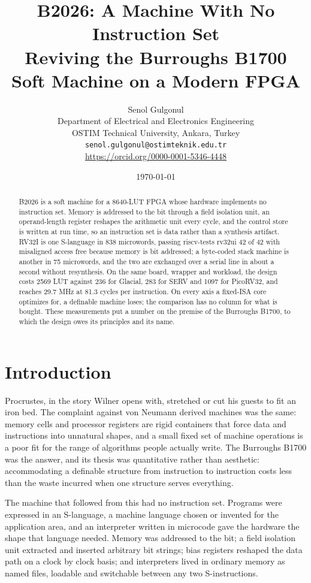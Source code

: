 \documentclass[11pt,a4paper]{article}
\title{B2026: A Machine With No Instruction Set\\
Reviving the Burroughs B1700 Soft Machine on a Modern FPGA}
\author{Senol Gulgonul\\
Department of Electrical and Electronics Engineering\\
OSTIM Technical University, Ankara, Turkey\\
\texttt{senol.gulgonul@ostimteknik.edu.tr}\\
\url{https://orcid.org/0000-0001-5346-4448}}
\date{\today}
\begin{document}
\maketitle

\begin{abstract}
B2026 is a soft machine for a 8640-LUT FPGA whose hardware implements
no instruction set. Memory is addressed to the bit through a field
isolation unit, an operand-length register reshapes the arithmetic unit
every cycle, and the control store is written at run time, so an
instruction set is data rather than a synthesis artifact. RV32I is one
S-language in 838 microwords, passing riscv-tests rv32ui 42 of 42 with
misaligned access free because memory is bit addressed; a byte-coded
stack machine is another in 75 microwords, and the two are exchanged
over a serial line in about a second without resynthesis. On the same
board, wrapper and workload, the design costs 2569 LUT against 236 for
Glacial, 283 for SERV and 1097 for PicoRV32, and reaches 29.7 MHz at
81.3 cycles per instruction. On every axis a fixed-ISA core optimizes
for, a definable machine loses; the comparison has no column for what
is bought. These measurements put a number on the premise of the
Burroughs B1700, to which the design owes its principles and its name.
\end{abstract}

\section{Introduction}

Procrustes, in the story Wilner opens with, stretched or cut his guests
to fit an iron bed. The complaint against von Neumann derived machines
was the same: memory cells and processor registers are rigid containers
that force data and instructions into unnatural shapes, and a small
fixed set of machine operations is a poor fit for the range of
algorithms people actually write. The Burroughs B1700 was the answer,
and its thesis was quantitative rather than aesthetic: accommodating a
definable structure from instruction to instruction costs less than the
waste incurred when one structure serves everything.

The machine that followed from this had no instruction set. Programs
were expressed in an S-language, a machine language chosen or invented
for the application area, and an interpreter written in microcode gave
the hardware the shape that language needed. Memory was addressed to
the bit; a field isolation unit extracted and inserted arbitrary bit
strings; bias registers reshaped the data path on a clock by clock
basis; and interpreters lived in ordinary memory as named files,
loadable and switchable between any two S-instructions.
\end{document}
